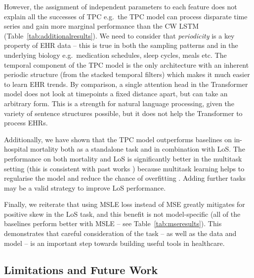 \documentclass[sigconf]{acmart}
\begin{document}
However, the assignment of independent parameters to each feature does not explain all the successes of TPC e.g.\ the TPC model can process disparate time series and gain more marginal performance than the CW LSTM (Table~\ref{tab:additionalresults}). We need to consider that \textit{periodicity} is a key property of EHR data -- this is true in both the sampling patterns and in the underlying biology e.g.\ medication schedules, sleep cycles, meals etc. The temporal component of the TPC model is the only architecture with an inherent periodic structure (from the stacked temporal filters) which makes it much easier to learn EHR trends. By comparison, a single attention head in the Transformer model does not look at timepoints a fixed distance apart, but can take an arbitrary form. This is a strength for natural language processing, given the variety of sentence structures possible, but it does not help the Transformer to process EHRs.

Additionally, we have shown that the TPC model outperforms baselines on in-hospital mortality both as a standalone task and in combination with LoS. The performance on both mortality and LoS is significantly better in the multitask setting (this is consistent with past works \citep{harutyunyan, sheikhalishahi2019benchmarking}) because multitask learning helps to regularise the model and reduce the chance of overfitting \citep{multitaskoverfitting}. Adding further tasks may be a valid strategy to improve LoS performance.

Finally, we reiterate that using MSLE loss instead of MSE greatly mitigates for positive skew in the LoS task, and this benefit is not model-specific (all of the baselines perform better with MSLE -- see Table~\ref{tab:mseresults}). This demonstrates that careful consideration of the task -- as well as the data and model -- is an important step towards building useful tools in healthcare.

\subsection{Limitations and Future Work}
\end{document}
